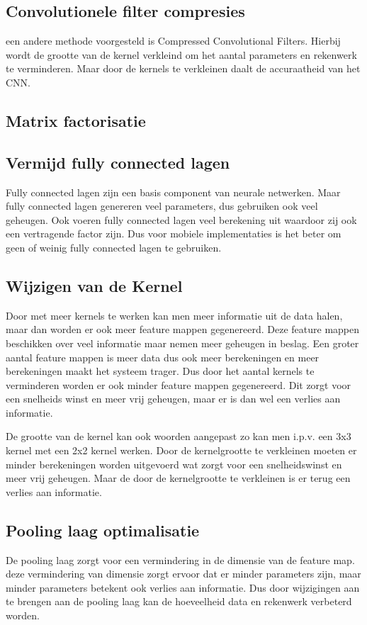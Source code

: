 \subsection{Convolutionele filter compresies}
een andere methode voorgesteld is Compressed Convolutional Filters.
Hierbij wordt de grootte van de kernel verkleind om het aantal parameters en rekenwerk te verminderen.
Maar door de kernels te verkleinen daalt de accuraatheid van het CNN.

\subsection{Matrix factorisatie}


\subsection{Vermijd fully connected lagen}
Fully connected lagen zijn een basis component van neurale netwerken.
Maar fully connected lagen genereren veel parameters, dus gebruiken ook veel geheugen.
Ook voeren fully connected lagen veel berekening uit waardoor zij ook een vertragende factor zijn.
Dus voor mobiele implementaties is het beter om geen of weinig fully connected lagen te gebruiken.

\subsection{Wijzigen van de Kernel}
Door met meer kernels te werken kan men meer informatie uit de data halen, maar dan worden er ook meer feature mappen gegenereerd.
Deze feature mappen beschikken over veel informatie maar nemen meer geheugen in beslag.
Een groter aantal feature mappen is meer data dus ook meer berekeningen en meer berekeningen maakt het systeem trager.
Dus door het aantal kernels te verminderen worden er ook minder feature mappen gegenereerd.
Dit zorgt voor een snelheids winst en meer vrij geheugen, maar er is dan wel een verlies aan informatie.

De grootte van de kernel kan ook woorden aangepast zo kan men i.p.v. een 3x3 kernel met een 2x2 kernel werken.
Door de kernelgrootte te verkleinen moeten er minder berekeningen worden uitgevoerd wat zorgt voor een snelheidswinst en meer vrij geheugen.
Maar de door de kernelgrootte te verkleinen is er terug een verlies aan informatie.


\subsection{Pooling laag optimalisatie}
De pooling laag zorgt voor een vermindering in de dimensie van de feature map.
deze vermindering van dimensie zorgt ervoor dat er minder parameters zijn, maar minder parameters betekent ook verlies aan informatie.
Dus door wijzigingen aan te brengen aan de pooling laag kan de hoeveelheid data en rekenwerk verbeterd worden.

